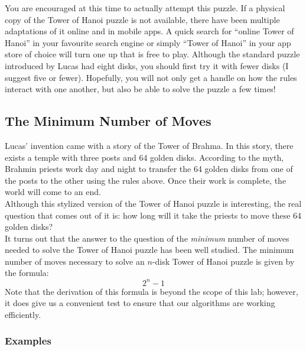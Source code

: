 		You are encouraged at this time to actually attempt this puzzle. If a physical copy of the Tower of Hanoi puzzle is not available, there have been multiple adaptations of it online and in mobile apps. A quick search for ``online Tower of Hanoi'' in your favourite search engine or simply ``Tower of Hanoi'' in your app store of choice will turn one up that is free to play. Although the standard puzzle introduced by Lucas had eight disks, you should first try it with fewer disks (I suggest five or fewer). Hopefully, you will not only get a handle on how the rules interact with one another, but also be able to solve the puzzle a few times!

		\subsection{The Minimum Number of Moves}
			Lucas' invention came with a story of the Tower of Brahma. In this story, there exists a temple with three posts and 64 golden disks. According to the myth, Brahmin priests work day and night to transfer the 64 golden disks from one of the posts to the other using the rules above. Once their work is complete, the world will come to an end.\\[\baselineskip]
			Although this stylized version of the Tower of Hanoi puzzle is interesting, the real question that comes out of it is: how long will it take the priests to move these 64 golden disks?\\[\baselineskip]
			It turns out that the answer to the question of the \emph{minimum} number of moves needed to solve the Tower of Hanoi puzzle has been well studied. The minimum number of moves necessary to solve an $n$-disk Tower of Hanoi puzzle is given by the formula:
			\[ 2^{n} - 1 \]
			Note that the derivation of this formula is beyond the scope of this lab; however, it does give us a convenient test to ensure that our algorithms are working efficiently.

			\subsubsection*{Examples}
			\ \\[9pt]

